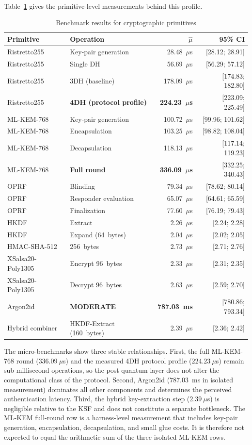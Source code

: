 \documentclass[preprint,12pt]{elsarticle}
\theoremstyle{remark}
\begin{document}
Table~\ref{tab:micro-bench} gives the primitive-level measurements
behind this profile.

\begin{table}[htbp]
\caption{Benchmark results for cryptographic primitives}
\label{tab:micro-bench}
\centering\small
\begin{tabular*}{\textwidth}{@{\extracolsep{\fill}}llrr@{}}
\toprule
Primitive & Operation & $\hat{\mu}$ & 95\% CI \\
\midrule
Ristretto255 & Key-pair generation & 28.48~$\mu$s & [28.12; 28.91] \\
Ristretto255 & Single DH & 56.69~$\mu$s & [56.29; 57.12] \\
Ristretto255 & 3DH (baseline) & 178.09~$\mu$s & [174.83; 182.80] \\
Ristretto255 & \textbf{4DH (protocol profile)} & \textbf{224.23~$\mu$s} & [223.09; 225.49] \\
ML-KEM-768 & Key-pair generation & 100.72~$\mu$s & [99.96; 101.62] \\
ML-KEM-768 & Encapsulation & 103.25~$\mu$s & [98.82; 108.04] \\
ML-KEM-768 & Decapsulation & 118.13~$\mu$s & [117.14; 119.23] \\
ML-KEM-768 & \textbf{Full round} & \textbf{336.09~$\mu$s} & [332.25; 340.43] \\
OPRF & Blinding & 79.34~$\mu$s & [78.62; 80.14] \\
OPRF & Responder evaluation & 65.07~$\mu$s & [64.61; 65.59] \\
OPRF & Finalization & 77.60~$\mu$s & [76.19; 79.43] \\
HKDF & Extract & 2.26~$\mu$s & [2.24; 2.28] \\
HKDF & Expand (64~bytes) & 2.04~$\mu$s & [2.02; 2.05] \\
HMAC-SHA-512 & 256~bytes & 2.73~$\mu$s & [2.71; 2.76] \\
XSalsa20-Poly1305 & Encrypt 96~bytes & 2.33~$\mu$s & [2.31; 2.35] \\
XSalsa20-Poly1305 & Decrypt 96~bytes & 2.63~$\mu$s & [2.59; 2.70] \\
Argon2id & \textbf{MODERATE} & \textbf{787.03~ms} & [780.86; 793.34] \\
Hybrid combiner & HKDF-Extract (160~bytes) & 2.39~$\mu$s & [2.36; 2.42] \\
\bottomrule
\end{tabular*}
\end{table}

The micro-benchmarks show three stable relationships. First, the full
ML-KEM-768 round ($336.09~\mu$s) and the measured 4DH protocol profile
($224.23~\mu$s) remain sub-millisecond operations, so the
post-quantum layer does not alter the computational class of the
protocol. Second, Argon2id ($787.03$~ms in isolated measurement)
dominates all other components and determines the perceived
authentication latency. Third, the hybrid key-extraction step
($2.39~\mu$s) is negligible relative to the KSF and does not
constitute a separate bottleneck.
The ML-KEM full-round row is a harness-level measurement that includes
key-pair generation, encapsulation, decapsulation, and small glue costs. It
is therefore not expected to equal the arithmetic sum of the three isolated
ML-KEM rows.
\end{document}
